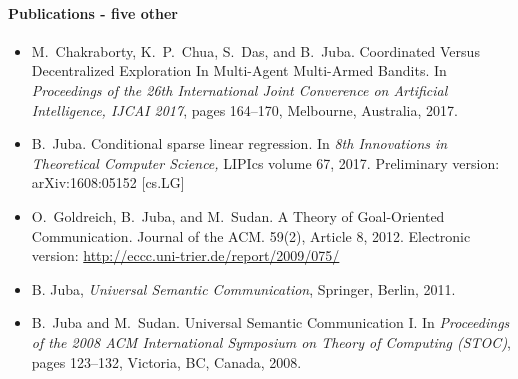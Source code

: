\documentclass[12pt]{article}
\begin{document}
\paragraph{Publications - five other}
\begin{itemize}
 \item M.~Chakraborty, K.~P.~Chua, S.~Das, and B.~Juba. 
    \newblock Coordinated Versus Decentralized Exploration In Multi-Agent 
              Multi-Armed Bandits.
    \newblock In {\em Proceedings of the 26th International Joint Converence on 
              Artificial Intelligence, IJCAI 2017}, pages 164--170, Melbourne, 
              Australia, 2017. 

 \item B.~Juba.
    \newblock Conditional sparse linear regression.
    \newblock In {\em 8th Innovations in Theoretical Computer Science,}
              LIPIcs volume 67, 2017.
    \newblock Preliminary version: arXiv:1608:05152 [cs.LG]

  \item O.~Goldreich, B.~Juba, and M.~Sudan.
    \newblock A Theory of Goal-Oriented Communication.
    \newblock Journal of the ACM. 59(2), Article 8, 2012.
    \newblock Electronic version: \url{http://eccc.uni-trier.de/report/2009/075/}
    
  \item B. Juba, {\em Universal Semantic Communication}, Springer, Berlin, 2011.
  
    \item B.~Juba and M.~Sudan.
    \newblock Universal Semantic Communication I.
    \newblock In {\em Proceedings of the 2008 ACM International Symposium on 
              Theory of Computing (STOC)}, pages 123--132, Victoria, BC, Canada, 2008.

\end{itemize}
\end{document}
